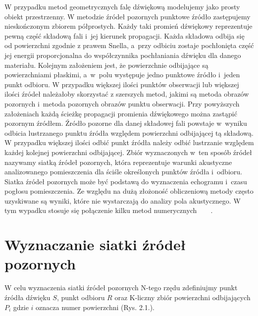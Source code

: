 W przypadku metod geometrycznych falę dźwiękową modelujemy jako prosty obiekt przestrzenny. W metodzie źródeł pozornych punktowe źródło zastępujemy nieskończonym zbiorem półprostych. Każdy taki promień dźwiękowy reprezentuje pewną część składową fali i~jej kierunek propagacji. Każda składowa odbija się od powierzchni zgodnie z prawem Snella, a~przy odbiciu zostaje pochłonięta część jej energii proporcjonalna do współczynnika pochłaniania dźwięku dla danego materiału. Kolejnym założeniem jest, że powierzchnie odbijające są powierzchniami płaskimi, a~w~polu występuje jedno  punktowe źródło i~jeden punkt odbioru. W przypadku większej ilości punktów obserwacji lub większej ilości źródeł należałoby skorzystać z szerszych metod, jakimi są metoda obrazów pozornych i~metoda pozornych obrazów punktu obserwacji. Przy powyższych założeniach  każdą ścieżkę propagacji promienia dźwiękowego można zastąpić pozornym źródłem. Źródło pozorne dla danej składowej fali powstaje w~wyniku odbicia lustrzanego punktu źródła względem powierzchni odbijającej tą składową. W przypadku większej ilości odbić punkt źródła należy odbić lustrzanie względem każdej kolejnej powierzchni odbijającej. Zbiór wyznaczonych w~ten sposób źródeł nazywamy siatką źródeł pozornych, która reprezentuje warunki akustyczne analizowanego pomieszczenia dla ściśle określonych punktów źródła i~odbioru. Siatka źródeł pozornych może być podstawą do wyznaczenia echogramu i~czasu pogłosu pomieszczenia. Ze względu na dużą złożoność obliczeniową metody często uzyskiwane są wyniki, które nie wystarczają do analizy pola akustycznego. W tym wypadku stosuje się połączenie kilku metod numerycznych~\cite{b11}~\cite{b12}~\cite{b13}~\cite{b14}.


\section{Wyznaczanie siatki źródeł pozornych}\label{sec:szp}

W celu wyznaczenia siatki źródeł pozornych N-tego rzędu zdefiniujmy punkt źródła dźwięku $S$, punkt odbioru $R$ oraz K-liczny zbiór powierzchni odbijających $P_i$ gdzie $i$ oznacza numer powierzchni (Rys. 2.1.). 

